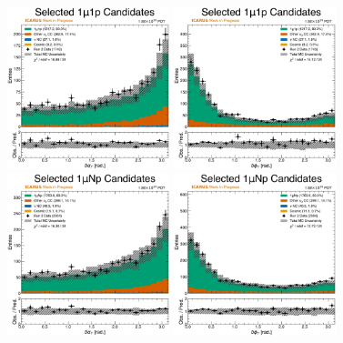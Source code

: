 \begin{figure}
    \centering
    \includegraphics[width=0.42\textwidth]{figures/data_mc_comparisons/datamc_hist1d_1mu1p_delta_alphaT.pdf}
    \includegraphics[width=0.42\textwidth]{figures/data_mc_comparisons/datamc_hist1d_1mu1p_delta_phiT.pdf}
    \\
    \includegraphics[width=0.42\textwidth]{figures/data_mc_comparisons/datamc_hist1d_1muNp_delta_alphaT.pdf}
    \includegraphics[width=0.42\textwidth]{figures/data_mc_comparisons/datamc_hist1d_1muNp_delta_phiT.pdf}

\end{figure}
